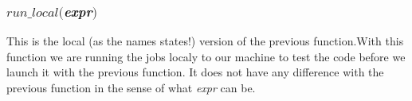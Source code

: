 \subsubsection*{$run\_local($\textit{expr}$)$}
This is the local (as the names states!) version of the previous function.With this function we are running the jobs localy to our machine to test the code before we launch it with the previous function. It does not have any difference with the previous function in the sense of what \textit{expr} can be.
